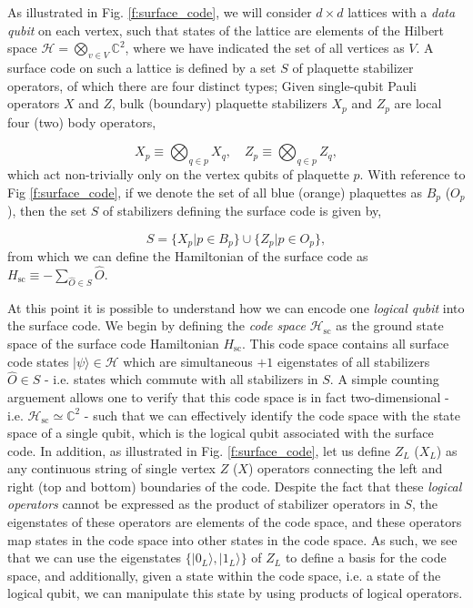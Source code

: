 \documentclass[onecolumn,preprintnumbers,amsmath,amssymb,notitlepage,nofootinbib,longbibliography,superscriptaddress,aps,pra,10pt]{revtex4-1}
\begin{document}
    As illustrated in Fig. \ref{f:surface_code}, we will consider $d\times d$ lattices with a \textit{data qubit} on each vertex, such that states of the lattice are elements of the Hilbert space $\mathcal{H} = \bigotimes_{v \in V}\mathbb{C}^2$, where we have indicated the set of all vertices as $V$. A surface code on such a lattice is defined by a set $S$ of plaquette stabilizer operators, of which there are four distinct types; Given single-qubit Pauli operators $X$ and $Z$, bulk (boundary) plaquette stabilizers $X_{p}$ and $Z_{p}$ are local four (two) body operators,

    \begin{equation}
        X_{p} \equiv \bigotimes_{q \in p} X_q, \quad Z_{p} \equiv \bigotimes_{q \in p} Z_q,
    \end{equation}
    which act non-trivially only on the vertex qubits of plaquette $p$. With reference to Fig \ref{f:surface_code}, if we denote the set of all blue (orange) plaquettes as $B_p$ ($O_p$), then the set $S$ of stabilizers defining the surface code is given by,

    \begin{equation}
        S = \big\{ X_p \vert p \in B_p  \big\} \cup \big\{ Z_p \vert p \in O_p  \big\},
    \end{equation}
    from which we can define the Hamiltonian of the surface code as $H_{\mathrm{sc}} \equiv -\sum_{\hat{O} \in S}\hat{O}$. 

    At this point it is possible to understand how we can encode one \textit{logical qubit} into the surface code. We begin by defining the \textit{code space} $\mathcal{H}_{\mathrm{sc}}$ as the ground state space of the surface code Hamiltonian $H_{\mathrm{sc}}$. This code space contains all surface code states $|\psi\rangle \in \mathcal{H}$ which are simultaneous $+1$ eigenstates of all stabilizers $\hat{O} \in S$ - i.e. states which commute with all stabilizers in $S$. A simple counting arguement allows one to verify that this code space is in fact two-dimensional - i.e. $\mathcal{H}_{\mathrm{sc}} \simeq \mathbb{C}^2$ - such that we can effectively identify the code space with the state space of a single qubit, which is the logical qubit associated with the surface code. In addition, as illustrated in Fig. \ref{f:surface_code}, let us define $Z_L$ ($X_L$) as any continuous string of single vertex $Z$ ($X$) operators connecting the left and right (top and bottom) boundaries of the code. Despite the fact that these \textit{logical operators} cannot be expressed as the product of stabilizer operators in $S$, the eigenstates of these operators are elements of the code space, and these operators map states in the code space into other states in the code space. As such, we see that we can use the eigenstates $\{ |0_L\rangle, |1_L\rangle \}$ of $Z_L$ to define a basis for the code space, and additionally, given a state within the code space, i.e. a state of the logical qubit, we can manipulate this state by using products of logical operators. 
\end{document}
